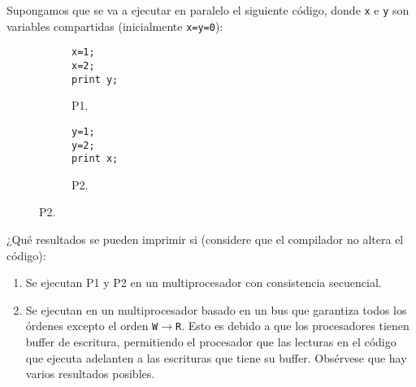 \begin{ejercicio}
    Supongamos que se va a ejecutar en paralelo el siguiente código, donde \verb|x| e \verb|y| son variables
    compartidas (inicialmente \verb|x=y=0|):
    \begin{figure}[H]
        \centering
        \begin{subfigure}{0.3\textwidth}
            \begin{verbatim}
x=1;
x=2;
print y;
            \end{verbatim}
            \caption{P1.}
        \end{subfigure}\hspace{3cm}
        \begin{subfigure}{0.3\textwidth}
            \begin{verbatim}
y=1;
y=2;
print x;
            \end{verbatim}
            \caption{P2.}            
        \end{subfigure}
    \end{figure}

    ¿Qué resultados se pueden imprimir si (considere que el compilador no altera el código):
    \begin{enumerate}
        \item Se ejecutan P1 y P2 en un multiprocesador con consistencia secuencial.
        \item Se ejecutan en un multiprocesador basado en un bus que garantiza todos los órdenes excepto el
        orden \verb|W|$\to$\verb|R|. Esto es debido a que los procesadores tienen buffer de escritura, permitiendo el
        procesador que las lecturas en el código que ejecuta adelanten a las escrituras que tiene su buffer.
        Obsérvese que hay varios resultados posibles.
    \end{enumerate}
\end{ejercicio}


